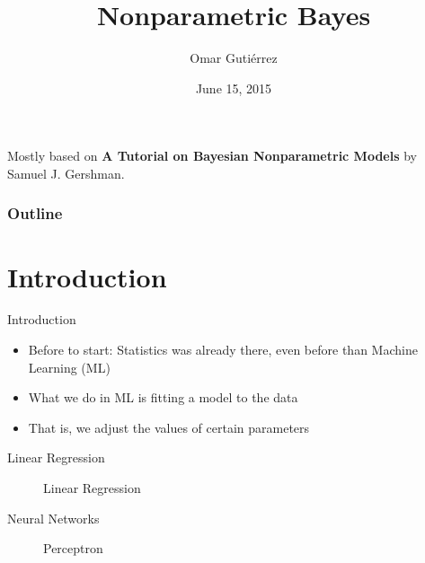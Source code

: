 \documentclass[handout]{beamer}
\title[\insertdate]{Nonparametric Bayes}
\author{Omar Guti\'errez}
\institute{@omargz}
\date{June 15, 2015}
\begin{document}
\begin{frame}
\titlepage
Mostly based on \textbf{A Tutorial on Bayesian Nonparametric Models} by Samuel J. Gershman.
\end{frame}

\begin{frame}
    \frametitle{Outline} 
    \tableofcontents
\end{frame}

\section{Introduction}
\begin{frame}{Introduction}
    \begin{itemize}
        \item Before to start: Statistics was already there, even before than Machine Learning (ML)
        \item What we do in ML is fitting a model to the data
        \item That is, we adjust the values of certain parameters
    \end{itemize}
\end{frame}

\begin{frame}{Linear Regression}
\begin{figure}[H]
    \centering
    
    \caption{Linear Regression}
\end{figure}
\end{frame}

\begin{frame}{Neural Networks}
\begin{figure}[H]
    \centering
    
    \caption{Perceptron}
\end{figure}
\end{frame}
\end{document}
